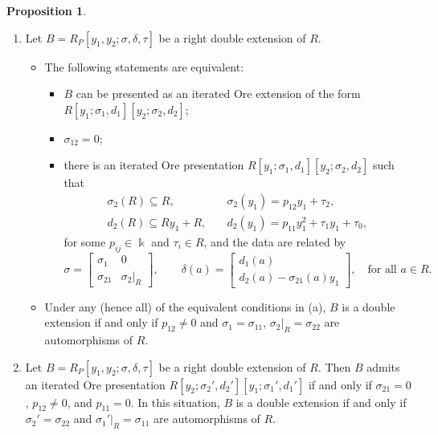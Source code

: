 \documentclass{amsart}
\theoremstyle{definition}
\newtheorem{proposition}[theorem]{Proposition}
\theoremstyle{remark}
\numberwithin{equation}{section}
\begin{document}
\begin{proposition}\label{Carvalhoetal2011Theorems2.2and2.4}
\begin{enumerate}
    \item[\rm (1)] \cite[Theorem 2.2]{Carvalhoetal2011}
    Let $B=R_P[y_1,y_2;\sigma,\delta,\tau]$ be a right double extension of $R$.
    \begin{itemize}
        \item[\rm (a)] The following statements are equivalent:
        \begin{itemize}
            \item $B$ can be presented as an iterated Ore extension of the form $R[y_1;\sigma_1,d_1][y_2;\sigma_2,d_2]$;
            \item $\sigma_{12}=0$;
            \item there is an iterated Ore presentation $R[y_1;\sigma_1,d_1][y_2;\sigma_2,d_2]$ such that
            \begin{align*}
                \sigma_2(R)\subseteq R,\quad &\sigma_2(y_1)=p_{12}y_1+\tau_2,\\
                d_2(R)\subseteq Ry_1+R,\quad &d_2(y_1)=p_{11}y_1^2+\tau_1y_1+\tau_0,
            \end{align*}
            for some $p_{ij}\in\Bbbk$ and $\tau_i\in R$, and the data are related by
            \[
            \sigma=\begin{bmatrix}\sigma_{1}&0\\ \sigma_{21}&\sigma_2|_R\end{bmatrix},
            \qquad
            \delta(a)=\begin{bmatrix}d_1(a)\\ d_2(a)-\sigma_{21}(a)y_1\end{bmatrix},
            \quad \text{for all }a\in R.
            \]
        \end{itemize}

        \item[\rm (b)] Under any (hence all) of the equivalent conditions in (a), $B$ is a double extension if and only if $p_{12}\neq 0$ and $\sigma_1=\sigma_{11}$, $\sigma_2|_R=\sigma_{22}$ are automorphisms of $R$.
    \end{itemize}

    \item[\rm (2)] \cite[Theorem 2.4]{Carvalhoetal2011}
    Let $B=R_P[y_1,y_2;\sigma,\delta,\tau]$ be a right double extension of $R$.
    Then $B$ admits an iterated Ore presentation $R[y_2;\sigma_2',d_2'][y_1;\sigma_1',d_1']$ if and only if $\sigma_{21}=0$, $p_{12}\neq 0$, and $p_{11}=0$.
    In this situation, $B$ is a double extension if and only if $\sigma_2'=\sigma_{22}$ and $\sigma_1'|_R=\sigma_{11}$ are automorphisms of $R$.
\end{enumerate}
\end{proposition}
\end{document}
